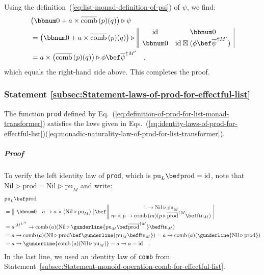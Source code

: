 Using the definition~(\ref{eq:list-monad-definition-of-psi}) of
$\psi$, we find:
\begin{align*}
 & \big(\bbnum 0+a\times\overline{\text{comb}}\,(p)(q)\big)\triangleright\psi\\
 & =\big(\bbnum 0+a\times\overline{\text{comb}}\,(p)(q)\big)\triangleright\,\begin{array}{||cc|}
\text{id} & \bbnum 0\\
\bbnum 0 & \text{id}\boxtimes(\phi\bef\overline{\psi}^{\uparrow M^{\prime}})
\end{array}\\
 & =a\times\big(\overline{\text{comb}}\,(p)(q)\big)\triangleright\phi\bef\overline{\psi}^{\uparrow M^{\prime}}\quad,
\end{align*}
which equals the right-hand side above. This completes the proof.

\subsubsection{Statement \label{subsec:Statement-laws-of-prod-for-effectful-list}\ref{subsec:Statement-laws-of-prod-for-effectful-list}}

The function \lstinline!prod! defined by Eq.~(\ref{eq:definition-of-prod-for-list-monad-transformer})
satisfies the laws given in Eqs.~(\ref{eq:identity-laws-of-prod-for-effectful-list})\textendash (\ref{eq:monadic-naturality-law-of-prod-for-list-transformer}).

\subparagraph{Proof}

To verify the left identity law of \lstinline!prod!, which is $\text{pu}_{L}\bef\text{prod}=\text{id}$,
note that $\text{Nil}\triangleright\text{prod}=\text{Nil}\triangleright\text{pu}_{M}$
and write:
\begin{align*}
 & \text{pu}_{L}\bef\text{prod}\\
 & =\,\begin{array}{||cc|}
\bbnum 0 & a\rightarrow a\times(\text{Nil}\triangleright\text{pu}_{M})\end{array}\,\bef\,\begin{array}{||c|}
1\rightarrow\text{Nil}\triangleright\text{pu}_{M}\\
m\times p\rightarrow\text{comb}\,(m)(p\triangleright\overline{\text{prod}}^{\uparrow M}\bef\text{ftn}_{M})
\end{array}\\
 & =a^{:M^{L^{A}}}\rightarrow\text{comb}\,(a)(\text{Nil}\triangleright\gunderline{\text{pu}_{M}\bef\overline{\text{prod}}^{\uparrow M}}\bef\text{ftn}_{M})\\
 & =a\rightarrow\text{comb}\,(a)(\text{Nil}\triangleright\text{prod}\bef\gunderline{\text{pu}_{M}\bef\text{ftn}_{M}})=a\rightarrow\text{comb}\,(a)(\gunderline{\text{Nil}\triangleright\text{prod}})\\
 & =a\rightarrow\gunderline{\text{comb}\,(a)(\text{Nil}\triangleright\text{pu}_{M})}=a\rightarrow a=\text{id}\quad.
\end{align*}
In the last line, we used an identity law of \lstinline!comb! from
Statement~\ref{subsec:Statement-monoid-operation-comb-for-effectful-list}.

